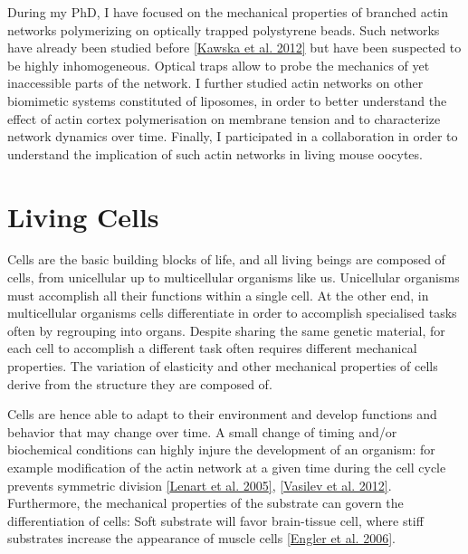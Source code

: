 \documentclass[A4paperpaper,11pt,english]{sphinxmanual}
\begin{document}
During my PhD, I have focused on the mechanical properties of branched actin
networks polymerizing on optically trapped polystyrene beads. Such networks have already been
studied before {\hyperref[index-latex:kawska2012]{{[}Kawska et al. 2012{]}}} but have been suspected to be highly
inhomogeneous. Optical traps allow to probe the mechanics of yet inaccessible parts of
the network.
I further studied actin
networks on other biomimetic systems constituted of liposomes, in order to better
understand the effect of actin cortex polymerisation on membrane tension and to
characterize network dynamics over time. Finally,  I participated in a
collaboration in order to understand the implication of such actin networks in
living mouse oocytes.


\section{Living Cells}
\label{index-latex:living-cells}
Cells are the basic building blocks of life, and all living beings are composed of
cells, from unicellular up to multicellular organisms like us. Unicellular
organisms must accomplish all their functions within a single cell. At the other end,
in multicellular organisms cells differentiate in order to accomplish specialised
tasks often by regrouping into organs. Despite sharing the same genetic
material, for each cell to accomplish a different task often requires different
mechanical properties. The variation of elasticity and other
mechanical properties of cells derive from the structure they are composed of.

Cells are hence able to adapt to their environment and develop functions and
behavior that may change over time. A small change of timing and/or biochemical
conditions can highly injure the development of an organism: for example modification of
the actin network at a given time during the cell cycle prevents symmetric division
{\hyperref[index-latex:lenart2005]{{[}Lenart et al. 2005{]}}}, {\hyperref[index-latex:vasilev2012]{{[}Vasilev et al. 2012{]}}}. Furthermore, the mechanical properties of the substrate can
govern the differentiation of cells: Soft substrate will favor brain-tissue
cell, where stiff substrates increase the appearance of muscle cells
{\hyperref[index-latex:engler2006]{{[}Engler et al. 2006{]}}}.
\end{document}
